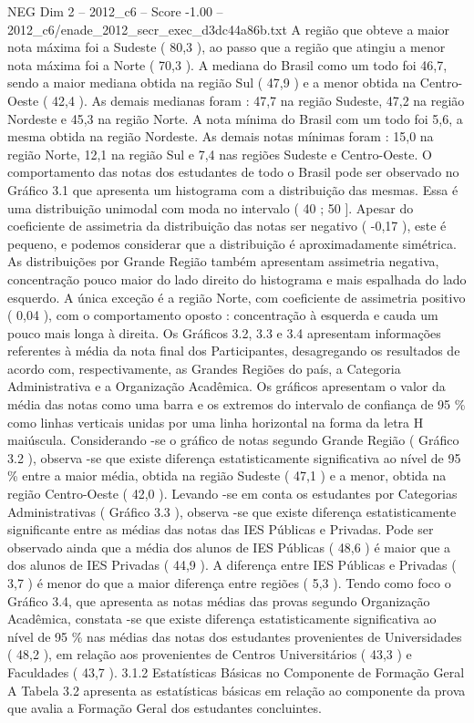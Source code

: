 \begin{textsample}{NEG Dim 2 – 2012\_c6 – Score -1.00 – 2012\_c6/enade\_2012\_secr\_exec\_d3dc44a86b.txt}
A região que obteve a maior nota máxima foi a Sudeste ( 80,3 ), ao passo que a região que atingiu a menor nota máxima foi a Norte ( 70,3 ).
A mediana do Brasil como um todo foi 46,7, sendo a maior mediana obtida na região Sul ( 47,9 ) e a menor obtida na Centro-Oeste ( 42,4 ).
As demais medianas foram : 47,7 na região Sudeste, 47,2 na região Nordeste e 45,3 na região Norte.
A nota mínima do Brasil com um todo foi 5,6, a mesma obtida na região Nordeste.
As demais notas mínimas foram : 15,0 na região Norte, 12,1 na região Sul e 7,4 nas regiões Sudeste e Centro-Oeste.
O comportamento das notas dos estudantes de todo o Brasil pode ser observado no Gráfico 3.1 que apresenta um histograma com a distribuição das mesmas.
Essa é uma distribuição unimodal com moda no intervalo ( 40 ; 50 ].
Apesar do coeficiente de assimetria da distribuição das notas ser negativo ( -0,17 ), este é pequeno, e podemos considerar que a distribuição é aproximadamente simétrica.
As distribuições por Grande Região também apresentam assimetria negativa, concentração pouco maior do lado direito do histograma e mais espalhada do lado esquerdo.
A única exceção é a região Norte, com coeficiente de assimetria positivo ( 0,04 ), com o comportamento oposto : concentração à esquerda e cauda um pouco mais longa à direita.
Os Gráficos 3.2, 3.3 e 3.4 apresentam informações referentes à média da nota final dos Participantes, desagregando os resultados de acordo com, respectivamente, as Grandes Regiões do país, a Categoria Administrativa e a Organização Acadêmica.
Os gráficos apresentam o valor da média das notas como uma barra e os extremos do intervalo de confiança de 95 \% como linhas verticais unidas por uma linha horizontal na forma da letra H maiúscula.
Considerando -se o gráfico de notas segundo Grande Região ( Gráfico 3.2 ), observa -se que existe diferença estatisticamente significativa ao nível de 95 \% entre a maior média, obtida na região Sudeste ( 47,1 ) e a menor, obtida na região Centro-Oeste ( 42,0 ).
Levando -se em conta os estudantes por Categorias Administrativas ( Gráfico 3.3 ), observa -se que existe diferença estatisticamente significante entre as médias das notas das IES Públicas e Privadas.
Pode ser observado ainda que a média dos alunos de IES Públicas ( 48,6 ) é maior que a dos alunos de IES Privadas ( 44,9 ).
A diferença entre IES Públicas e Privadas ( 3,7 ) é menor do que a maior diferença entre regiões ( 5,3 ).
Tendo como foco o Gráfico 3.4, que apresenta as notas médias das provas segundo Organização Acadêmica, constata -se que existe diferença estatisticamente significativa ao nível de 95 \% nas médias das notas dos estudantes provenientes de Universidades ( 48,2 ), em relação aos provenientes de Centros Universitários ( 43,3 ) e Faculdades ( 43,7 ). 3.1.2 Estatísticas Básicas no Componente de Formação Geral A Tabela 3.2 apresenta as estatísticas básicas em relação ao componente da prova que avalia a Formação Geral dos estudantes concluintes.

\end{textsample}
